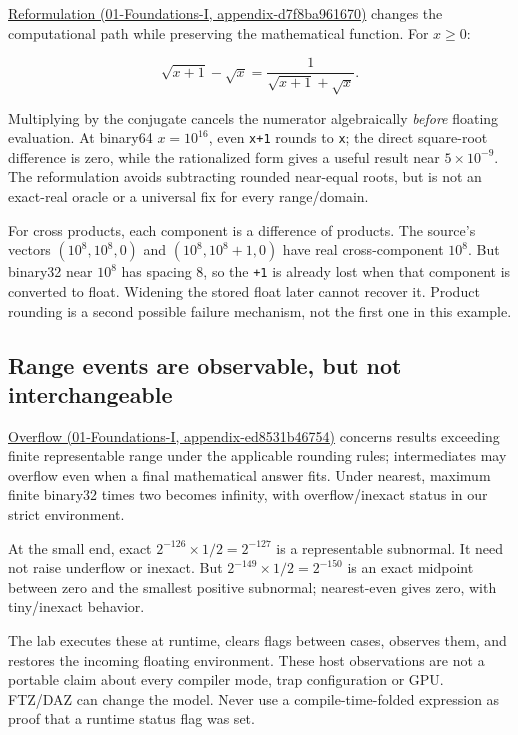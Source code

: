 \href{../01-Foundations-I/main.pdf\#nameddest=appendix-d7f8ba961670}{Reformulation (01-Foundations-I, appendix-d7f8ba961670)} changes the computational path while preserving the mathematical function. For \(x\ge0\):

\[
\sqrt{x+1}-\sqrt{x}
=\frac{1}{\sqrt{x+1}+\sqrt{x}}.
\]

Multiplying by the conjugate cancels the numerator algebraically \emph{before} floating evaluation. At binary64 \(x=10^{16}\), even \texttt{x+1} rounds to \texttt{x}; the direct square-root difference is zero, while the rationalized form gives a useful result near \(5\times10^{-9}\). The reformulation avoids subtracting rounded near-equal roots, but is not an exact-real oracle or a universal fix for every range/domain.

For cross products, each component is a difference of products. The source's vectors \((10^8,10^8,0)\) and \((10^8,10^8+1,0)\) have real cross-component \(10^8\). But binary32 near \(10^8\) has spacing 8, so the \texttt{+1} is already lost when that component is converted to float. Widening the stored float later cannot recover it. Product rounding is a second possible failure mechanism, not the first one in this example.

\subsection{Range events are observable, but not interchangeable}\label{05-engine-i-ch001-range-events-are-observable-but-not-interchangeable}

\href{../01-Foundations-I/main.pdf\#nameddest=appendix-ed8531b46754}{Overflow (01-Foundations-I, appendix-ed8531b46754)} concerns results exceeding finite representable range under the applicable rounding rules; intermediates may overflow even when a final mathematical answer fits. Under nearest, maximum finite binary32 times two becomes infinity, with overflow/inexact status in our strict environment.

At the small end, exact \(2^{-126}\times1/2=2^{-127}\) is a representable subnormal. It need not raise underflow or inexact. But \(2^{-149}\times1/2=2^{-150}\) is an exact midpoint between zero and the smallest positive subnormal; nearest-even gives zero, with tiny/inexact behavior.

The lab executes these at runtime, clears flags between cases, observes them, and restores the incoming floating environment. These host observations are not a portable claim about every compiler mode, trap configuration or GPU. FTZ/DAZ can change the model. Never use a compile-time-folded expression as proof that a runtime status flag was set.

